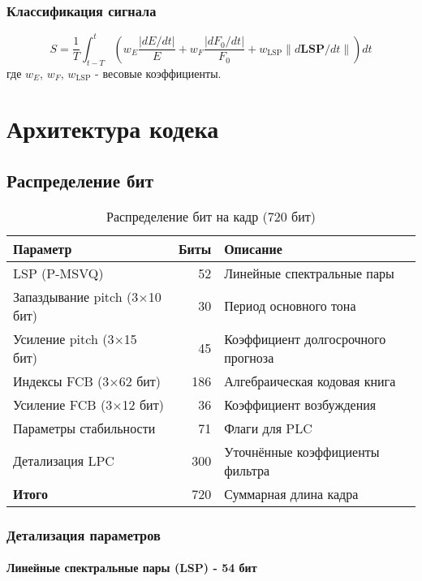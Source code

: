 \documentclass{report}
\begin{document}
	\subsection{Классификация сигнала}
	\begin{equation}
		S = \frac{1}{T} \int_{t-T}^{t} \left( w_E \frac{|dE/dt|}{E} + w_F \frac{|dF_0/dt|}{F_0} + w_{\text{LSP}} \|d\mathbf{LSP}/dt\| \right) dt
	\end{equation}
	где $w_E$, $w_F$, $w_{\text{LSP}}$ - весовые коэффициенты.
	
	\chapter{Архитектура кодека}
	\section{Распределение бит}
	\begin{table}[H]
		\centering
		\caption{Распределение бит на кадр (720 бит)}
		\begin{tabular}{lrl}
			\toprule
			\textbf{Параметр} & \textbf{Биты} & \textbf{Описание} \\
			\midrule
			LSP (P-MSVQ) & 52 & Линейные спектральные пары \\
			Запаздывание pitch (3$\times$10 бит) & 30 & Период основного тона \\
			Усиление pitch (3$\times$15 бит) & 45 & Коэффициент долгосрочного прогноза \\
			Индексы FCB (3$\times$62 бит) & 186 & Алгебраическая кодовая книга \\
			Усиление FCB (3$\times$12 бит) & 36 & Коэффициент возбуждения \\
			Параметры стабильности & 71 & Флаги для PLC \\
			Детализация LPC & 300 & Уточнённые коэффициенты фильтра \\
			\bottomrule
			\textbf{Итого} & 720 & Суммарная длина кадра \\
			\bottomrule
		\end{tabular}
	\end{table}
	
	\subsection{Детализация параметров}
	
	\subsubsection{Линейные спектральные пары (LSP) - 54 бит}
	
\end{document}
